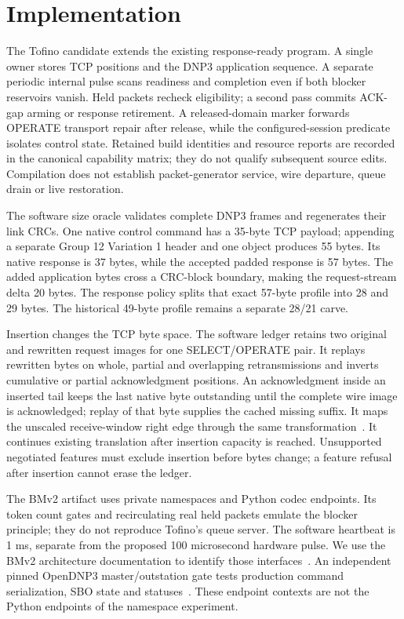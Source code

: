 \section{Implementation}
The Tofino candidate extends the existing response-ready program. A single owner
stores TCP positions and the DNP3 application sequence. A separate periodic
internal pulse scans readiness and completion even if both blocker reservoirs
vanish. Held packets recheck eligibility; a second pass commits ACK-gap arming
or response retirement. A released-domain marker forwards OPERATE transport
repair after release, while the configured-session predicate isolates control
state. Retained build identities and resource reports are recorded in the
canonical capability matrix; they do not qualify subsequent source edits.
Compilation does not establish packet-generator
service, wire departure, queue drain or live restoration.

The software size oracle validates complete DNP3 frames and regenerates their
link CRCs. One native control command has a 35-byte TCP payload; appending a
separate Group 12 Variation 1 header and one object produces 55 bytes. Its native
response is 37 bytes, while the accepted padded response is 57 bytes. The added
application bytes cross a CRC-block boundary, making the request-stream delta
20 bytes. The response policy splits that exact 57-byte profile into 28 and
29 bytes. The historical 49-byte profile remains a separate 28/21 carve.

Insertion changes the TCP byte space. The software ledger retains two original
and rewritten request images for one SELECT/OPERATE pair. It replays rewritten
bytes on whole, partial and overlapping retransmissions and inverts cumulative
or partial acknowledgment positions. An acknowledgment inside an inserted tail
keeps the last native byte outstanding until the complete wire image is
acknowledged; replay of that byte supplies the cached missing suffix. It maps
the unscaled receive-window right
edge through the same transformation~\cite{case4_rfc9293}. It continues existing
translation after insertion capacity is reached. Unsupported negotiated
features must exclude insertion before bytes change; a feature refusal after
insertion cannot erase the ledger.

The BMv2 artifact uses private namespaces and Python codec endpoints. Its token
count gates and recirculating real held packets emulate the blocker principle;
they do not reproduce Tofino's queue server. The software heartbeat is 1 ms,
separate from the proposed 100 microsecond hardware pulse. We use the BMv2
architecture documentation to identify those interfaces~\cite{case4_bmv2}.
An independent pinned OpenDNP3 master/outstation gate tests production command
serialization, SBO state and statuses~\cite{case4_opendnp3}. These endpoint
contexts are not the Python endpoints of the namespace experiment.
